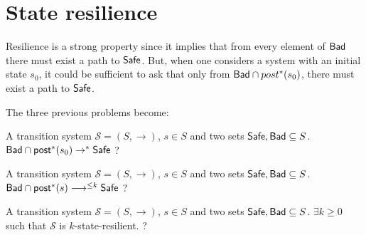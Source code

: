 



\section{State resilience}


Resilience is a strong property since it implies that from every element of $\textsf{Bad}$ there must exist a path to $\textsf{Safe}$. But, when one considers a system with an initial state $s_0$, it could be sufficient to ask that only from $\textsf{Bad} \cap post^*(s_0)$, there must exist a path to $\textsf{Safe}$. 
%
%
%


The three previous problems become:


{A transition system $\mathscr{S}=(S,\rightarrow)$, $s \in S$ and two sets $\textsf{Safe}, \textsf{Bad} \subseteq S$.}
{$\textsf{Bad} \cap \textsf{post}^*(s_0)  \rightarrow^{*} \textsf{Safe} $ ? \newline}


{A transition system $\mathscr{S}=(S,\rightarrow)$, $s \in S$ and two sets $\textsf{Safe}, \textsf{Bad} \subseteq S$.}
{ $\textsf{Bad} \cap \textsf{post}^*(s) \longrightarrow^{\leq k} \textsf{Safe}$ ?  \newline}
%

{A transition system $\mathscr{S}=(S,\rightarrow)$, $s \in S$ and two sets $\textsf{Safe}, \textsf{Bad} \subseteq S$.}
{$\exists k \geq 0$ such that $\mathscr{S}$ is $k$-state-resilient. ?\newline}


